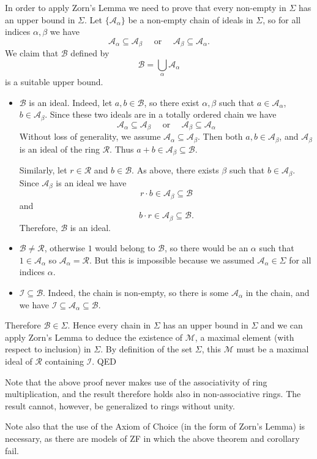 \documentclass[12pt]{article}
\begin{document}
In order to apply Zorn's Lemma
we need to prove that every non-empty 
in $\Sigma$ has an upper bound in $\Sigma$.
Let $\{\mathcal{A}_{\alpha}\}$ be a non-empty chain of ideals in $\Sigma$,
so for all indices $\alpha,\beta$ we have
$$\mathcal{A}_{\alpha}\subseteq \mathcal{A}_{\beta}\quad \text{ or }\quad \mathcal{A}_{\beta}\subseteq
\mathcal{A}_{\alpha}.$$
We claim that $\mathcal{B}$ defined by
$$\mathcal{B}=\bigcup_{\alpha}\mathcal{A}_{\alpha}$$
is a suitable upper bound.
\begin{itemize}
\item $\mathcal{B}$ is an ideal. Indeed, let $a,b\in\mathcal{B}$,
so there exist $\alpha,\beta$ such that $a\in
\mathcal{A}_{\alpha}$, $b\in\mathcal{A}_{\beta}$. Since these two
ideals are in a totally ordered chain we have
$$\mathcal{A}_{\alpha}\subseteq \mathcal{A}_{\beta}\quad \text{ or }\quad \mathcal{A}_{\beta}\subseteq
\mathcal{A}_{\alpha}$$ Without loss of generality, we assume
$\mathcal{A}_{\alpha}\subseteq \mathcal{A}_{\beta}$. Then both
$a,b\in \mathcal{A}_{\beta}$, and $\mathcal{A}_{\beta}$ is an
ideal of the ring $\mathcal{R}$. Thus $a+b\in
\mathcal{A}_{\beta}\subseteq \mathcal{B}$.

Similarly, let $r\in \mathcal{R}$ and $b\in \mathcal{B}$. As
above, there exists $\beta$ such that $b\in \mathcal{A}_{\beta}$.
Since $\mathcal{A}_{\beta}$ is an ideal we have
$$r\cdot b \in \mathcal{A}_{\beta}\subseteq\mathcal{B}$$
and
$$b\cdot r \in \mathcal{A}_{\beta}\subseteq\mathcal{B}.$$
Therefore, $\mathcal{B}$ is an ideal.

\item $\mathcal{B}\neq \mathcal{R}$, otherwise $1$ would belong to
$\mathcal{B}$, so there would be an $\alpha$ such that $1\in
\mathcal{A}_{\alpha}$ so $\mathcal{A}_{\alpha}=\mathcal{R}$. But
this is impossible because we assumed $\mathcal{A}_{\alpha}\in
\Sigma$ for all indices $\alpha$.

\item $\mathcal{I}\subseteq\mathcal{B}$.
Indeed, the chain is non-empty, 
so there is some $\mathcal{A}_\alpha$ in the chain,
and we have $\mathcal{I}\subseteq\mathcal{A}_\alpha\subseteq\mathcal{B}$.
\end{itemize}
Therefore $\mathcal{B}\in\Sigma$. Hence every chain in $\Sigma$
has an upper bound in $\Sigma$ and we can apply Zorn's Lemma to
deduce the existence of $\mathcal{M}$, a maximal element (with
respect to inclusion) in $\Sigma$.
By definition of the set $\Sigma$,
this $\mathcal{M}$ must be a maximal ideal of $\mathcal{R}$
containing $\mathcal{I}$. QED

Note that the above proof never makes use of 
the associativity of ring multiplication,
and the result therefore holds also in non-associative rings.
The result cannot, however, be generalized to rings without unity.

Note also that the use of the Axiom of Choice (in the form of Zorn's Lemma)
is necessary,
as there are models of ZF in which the above theorem and corollary fail.
\end{document}

